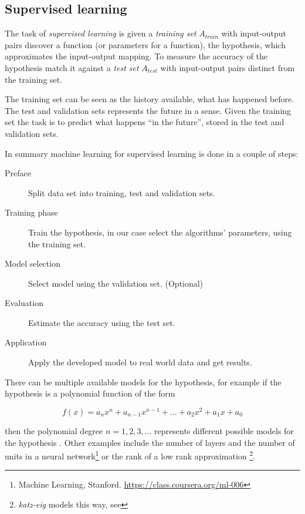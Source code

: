
\subsection{Supervised learning}\label{sec:background:theory:suplearn}

The task of \textit{supervised learning} is given a \textit{training set} $A_{train}$ with input-output pairs discover a function (or parameters for a function), the hypothesis, which approximates the input-output mapping.  To measure the accuracy of the hypothesis match it against a \textit{test set} $A_{test}$ with input-output pairs distinct from the training set.
\citep{norvigAI}

The training set can be seen as the history available, what has happened before. The test and validation sets represents the future in a sense. Given the training set the task is to predict what happens ``in the future'', stored in the test and validation sets.

In summary machine learning for supervised learning is done in a couple of steps:

\begin{description}
    \item[Preface] Split data set into training, test and validation sets.
    \item[Training phase] Train the hypothesis, in our case select the algorithms' parameters, using the training set.
    \item[Model selection] Select model using the validation set. (Optional)
    \item[Evaluation] Estimate the accuracy using the test set.
    \item[Application] Apply the developed model to real world data and get results.
\end{description}

There can be multiple available models for the hypothesis, for example if the hypothesis is a polynomial function of the form

\begin{equation}
f(x) = a_n x^n + a_{n - 1} x^{n - 1} + ... + a_2 x^2 + a_1 x + a_0
\end{equation}

then the polynomial degree $n = 1, 2, 3, ...$ represents different possible models for the hypothesis \citep{norvigAI}. Other examples include the number of layers and the number of units in a neural network\footnote{Machine Learning, Stanford. \url{https://class.coursera.org/ml-006}}
or the rank of a low rank approximation
\footnote{\textit{katz-eig} models this way, see }.

